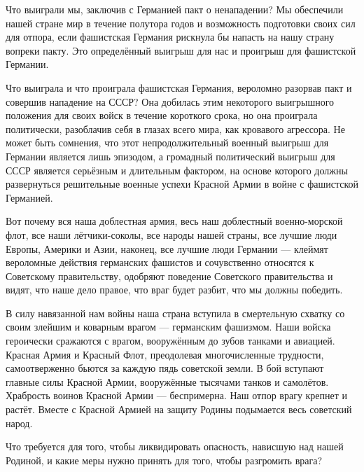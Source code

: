\documentclass[12pt, a4paper, openany]{book}
\begin{document}
Что выиграли мы, заключив с Германией пакт о ненападении? Мы обеспечили нашей стране мир в течение полутора годов и возможность подготовки своих сил для отпора, если фашистская Германия рискнула бы напасть на нашу страну вопреки пакту. Это определённый выигрыш для нас и проигрыш для фашистской Германии.

Что выиграла и что проиграла фашистская Германия, вероломно разорвав пакт и совершив нападение на СССР? Она добилась этим некоторого выигрышного положения для своих войск в течение короткого срока, но она проиграла политически, разоблачив себя в глазах всего мира, как кровавого агрессора. Не может быть сомнения, что этот непродолжительный военный выигрыш для Германии является лишь эпизодом, а громадный политический выигрыш для СССР является серьёзным и длительным фактором, на основе которого должны развернуться решительные военные успехи Красной Армии в войне с фашистской Германией.

Вот почему вся наша доблестная армия, весь наш доблестный военно-морской флот, все наши лётчики-соколы, все народы нашей страны, все лучшие люди Европы, Америки и Азии, наконец, все лучшие люди Германии — клеймят вероломные действия германских фашистов и сочувственно относятся к Советскому правительству, одобряют поведение Советского правительства и видят, что наше дело правое, что враг будет разбит, что мы должны победить.

В силу навязанной нам войны наша страна вступила в смертельную схватку со своим злейшим и коварным врагом — германским фашизмом. Наши войска героически сражаются с врагом, вооружённым до зубов танками и авиацией. Красная Армия и Красный Флот, преодолевая многочисленные трудности, самоотверженно бьются за каждую пядь советской земли. В бой вступают главные силы Красной Армии, вооружённые тысячами танков и самолётов. Храбрость воинов Красной Армии — беспримерна. Наш отпор врагу крепнет и растёт. Вместе с Красной Армией на защиту Родины подымается весь советский народ.

Что требуется для того, чтобы ликвидировать опасность, нависшую над нашей Родиной, и какие меры нужно принять для того, чтобы разгромить врага?
\end{document}
